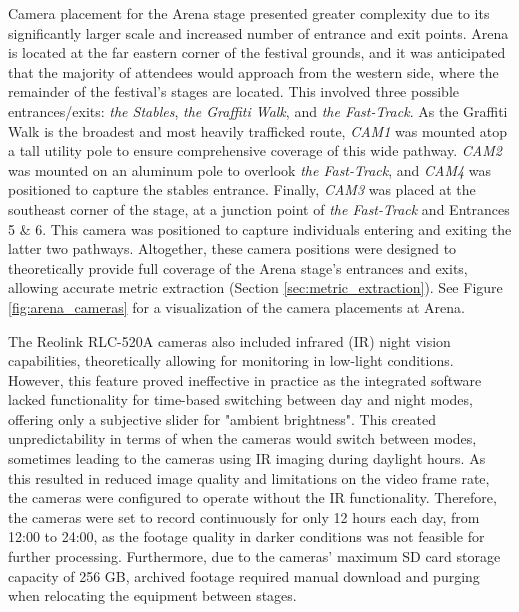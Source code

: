 Camera placement for the Arena stage presented greater complexity due to its significantly larger scale and increased number of entrance and exit points. Arena is located at the far eastern corner of the festival grounds, and it was anticipated that the majority of attendees would approach from the western side, where the remainder of the festival's stages are located. This involved three possible entrances/exits: \textit{the Stables}, \textit{the Graffiti Walk}, and \textit{the Fast-Track}. As the Graffiti Walk is the broadest and most heavily trafficked route, \textit{CAM1} was mounted atop a tall utility pole to ensure comprehensive coverage of this wide pathway. \textit{CAM2} was mounted on an aluminum pole to overlook \textit{the Fast-Track}, and \textit{CAM4} was positioned to capture the stables entrance. Finally, \textit{CAM3} was placed at the southeast corner of the stage, at a junction point of \textit{the Fast-Track} and Entrances 5 \& 6. This camera was positioned to capture individuals entering and exiting the latter two pathways. Altogether, these camera positions were designed to theoretically provide full coverage of the Arena stage's entrances and exits, allowing accurate metric extraction (Section \ref{sec:metric_extraction}). See Figure \ref{fig:arena_cameras} for a visualization of the camera placements at Arena.

The Reolink RLC-520A cameras also included infrared (IR) night vision capabilities, theoretically allowing for monitoring in low-light conditions. However, this feature proved ineffective in practice as the integrated software lacked functionality for time-based switching between day and night modes, offering only a subjective slider for "ambient brightness". This created unpredictability in terms of when the cameras would switch between modes, sometimes leading to the cameras using IR imaging during daylight hours. As this resulted in reduced image quality and limitations on the video frame rate, the cameras were configured to operate without the IR functionality. Therefore, the cameras were set to record continuously for only 12 hours each day, from 12:00 to 24:00, as the footage quality in darker conditions was not feasible for further processing. Furthermore, due to the cameras' maximum SD card storage capacity of 256 GB, archived footage required manual download and purging when relocating the equipment between stages.

